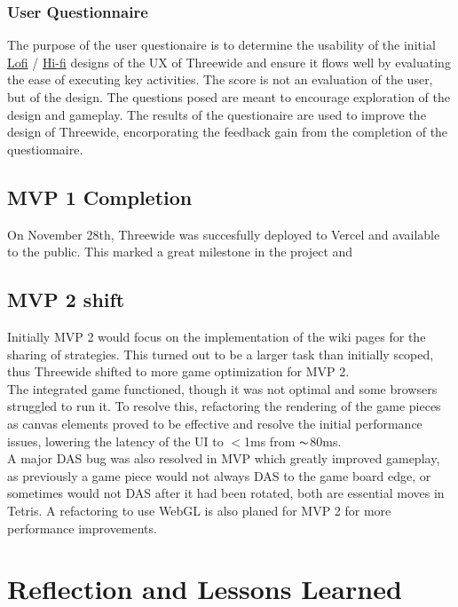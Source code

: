 \documentclass[english,course]{lecture}
\begin{document}
\subsubsection*{User Questionnaire}
The purpose of the user questionaire is to determine the usability of the initial \href{https://github.com/teamcrusher/threewide/blob/main/Design%20documentation/ThreeWide_Lo-fi%20Prototype.pdf}{Lofi} /
\href{https://www.figma.com/proto/MPkA2x9Ayz0kzfVcsjlM3L/Hi-Fi-Prototype?scaling=min-zoom&page-id=0%3A1&starting-point-node-id=0%3A3&node-id=0%3A3}{Hi-fi}
designs of the UX of Threewide and ensure it flows well by evaluating the ease of executing key activities. The score is not an evaluation of the user, but of the design. The questions posed are meant to encourage exploration of the design and gameplay. The results of the questionaire are used to improve the design of Threewide, encorporating the feedback gain from the completion of the questionnaire.
%
\subsection{MVP 1 Completion}
On November 28th, Threewide was succesfully deployed to Vercel and available to the public. This marked a great milestone in the project and
%
\subsection{MVP 2 shift}
Initially MVP 2 would focus on the implementation of the wiki pages for the sharing of strategies. This turned out to be a larger task than initially scoped, thus Threewide shifted to more game optimization for MVP 2. 
%
\\The integrated game functioned, though it was not optimal and some browsers struggled to run it. To resolve this, refactoring the rendering of the game pieces as canvas elements proved to be effective and resolve the initial performance issues, lowering the latency of the UI to $<$1ms from $\thicksim$80ms. 
%
\\A major DAS bug was also resolved in MVP which greatly improved gameplay, as previously a game piece would not always DAS to the game board edge, or sometimes would not DAS after it had been rotated, both are essential moves in Tetris. A refactoring to use WebGL is also planed for MVP 2 for more performance improvements.
%
\section{Reflection and Lessons Learned}
\end{document}
